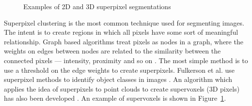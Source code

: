 \documentclass[11pt,a4paper]{kth-mag}
\begin{document}
\begin{figure}
  \centerline{
  }
  \caption{Examples of 2D and 3D superpixel segmentations}
  \label{fig:supervoxel}
\end{figure}

Superpixel clustering is the most common technique used for segmenting images.
The intent is to create regions in which all pixels have some sort of meaningful
relationship. Graph based algorithms treat pixels as nodes in a graph, where the
weights on edges between nodes are related to the similarity between the
connected pixels --- intensity, proximity and so on \cite{achanta2012slic}. The
most simple method is to use a threshold on the edge weights to create
superpixels. Fulkerson et al. use superpixel methods to identify object classes
in images \cite{fulkerson2009class}. An algorithm which applies the idea of
superpixels to point clouds to create supervoxels (3D pixels) has also been
developed \cite{papon2013voxel}. An example of supervoxels is shown in
Figure~\ref{fig:supervoxel}.
\end{document}
